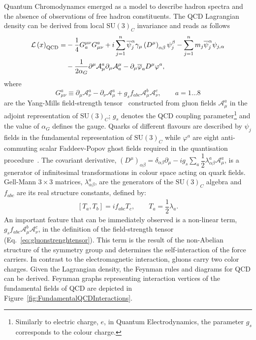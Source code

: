 Quantum Chromodynamcs emerged as a model to describe hadron spectra and the absence of observations of free hadron constituents. The QCD Lagrangian density can be derived from local $\mathrm{SU}\left(3\right)_{C}$ invariance and reads as follows
\begin{align}
 \mathcal{L}\left( x\right)_{\mathrm{QCD}}  = & -\dfrac{1}{4}G_a^{\mu\nu}G_{\mu\nu}^a + i\sum_{j=1}^n{\overline{\psi}^{\alpha}_j \gamma_\mu \left( D^\mu \right)_{\alpha\beta} \psi_j^\beta } - \sum_{j=1}^n{m_j\overline{\psi}^{\alpha}_j\psi_{j,\alpha}} \notag\\
					      & - \dfrac{1}{2\alpha_G} \partial^\mu \mathcal{A}^a_\mu \partial_\mu \mathcal{A}_a^\mu - \partial_\mu \overline{\varphi}_a D^\mu \varphi^a,
								\label{eq:qcdlagrangian}
\end{align}
where 
\begin{equation}
G_{\mu\nu}^a \equiv \partial_\mu \mathcal{A}^a_\nu - \partial_\nu \mathcal{A}^a_\mu + g_sf_{abc}\mathcal{A}^b_\mu \mathcal{A}^c_\nu , \qquad a=1 \ldots 8
\label{eq:gluonstrenghtensor}
\end{equation}
are the Yang-Mills field-strength tensor~\cite{Yang:1954ek} constructed from gluon fields $\mathcal{A}^a_\mu$ in the adjoint representation of $\mathrm{SU}\left(3\right)_C$; $g_s$ denotes the QCD coupling parameter\footnote{Similarly to electric charge, $e$, in Quantum Electrodynamics, the parameter $g_s$ corresponds to the colour charge.} and the value of $\alpha_G$ defines the gauge. Quarks of different flavours are described by $\psi_j$ fields in the fundamental representation of $\mathrm{SU}\left(3\right)_C$ while $\varphi^a$ are eight anti-commuting scalar Faddeev-Popov ghost fields required in the quantisation procedure~\cite{Faddeev:1967fc, DeWitt:1964yg}. The covariant derivative, $\left( D^\mu \right)_{\alpha\beta} = \delta_{\alpha\beta}\partial_\mu - ig_s\sum_a{\dfrac{1}{2}\lambda^a_{\alpha\beta}\mathcal{A}^a_\mu}$, is a generator of infinitesimal transformations in colour space acting on quark fields. Gell-Mann $3\times 3$ matrices, $\lambda^a_{\alpha\beta}$, are the generators of the $\mathrm{SU}\left(3\right)_C$ algebra and $f_{abc}$ are its real structure constants, defined by:
\begin{align}
 \left[T_a,T_b\right] = if_{abc}T_c,\qquad T_a = \dfrac{1}{2}\lambda_a.
\end{align}
An important feature that can be immediately observed is a non-linear term, $g_sf_{abc}\mathcal{A}^b_\mu \mathcal{A}^c_\nu$, in the definition of the field-strength tensor (Eq.~\eqref{eq:gluonstrenghtensor}). This term is the result of the non-Abelian structure of the symmetry group and determines the self-interaction of the force carriers. In contrast to the electromagnetic interaction, gluons carry two color charges. Given the Lagrangian density, the Feynman rules and diagrams for QCD can be derived.  Feynman graphs representing interaction vertices of the fundamental fields of QCD are depicted in Figure~\ref{fig:FundamentalQCDInteractions}.
